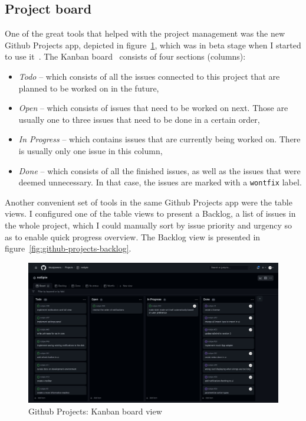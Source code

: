 \subsection{Project board}\label{sec:project-board}

One of the great tools that helped with the project management
was the new Github Projects app,
depicted in figure~\ref{fig:github-projects-kanban},
which was in beta stage
when I started to use it~\cite{github_inc_github_2022}.
The Kanban board~\cite{goddard_kanban_2022} consists of four sections (columns):

\begin{itemize}
      \item
            \textit{Todo} -- which consists of all the issues
            connected to this project
            that are planned to be worked on in the future,
      \item
            \textit{Open} -- which consists of issues
            that need to be worked on next.
            Those are usually one to three issues
            that need to be done in a certain order,
      \item
            \textit{In Progress} -- which contains issues
            that are currently being worked on.
            There is usually only one issue in this column,
      \item
            \textit{Done} -- which consists of all the finished issues,
            as well as the issues that were deemed unnecessary.
            In that case, the issues are marked with a \texttt{wontfix} label.
\end{itemize}

Another convenient set of tools in the same Github Projects app
were the table views.
I configured one of the table views to present a Backlog,
a list of issues in the whole project,
which I could manually sort by
issue priority and urgency
so as to enable quick progress overview.
The Backlog view is presented in figure~\ref{fig:github-projects-backlog}.

\begin{figure}[p]
      \centering
      \includegraphics[width=\linewidth,keepaspectratio]{img/kanban_board.jpg}
      \caption{Github Projects: Kanban board view}
      \label{fig:github-projects-kanban}
\end{figure}

